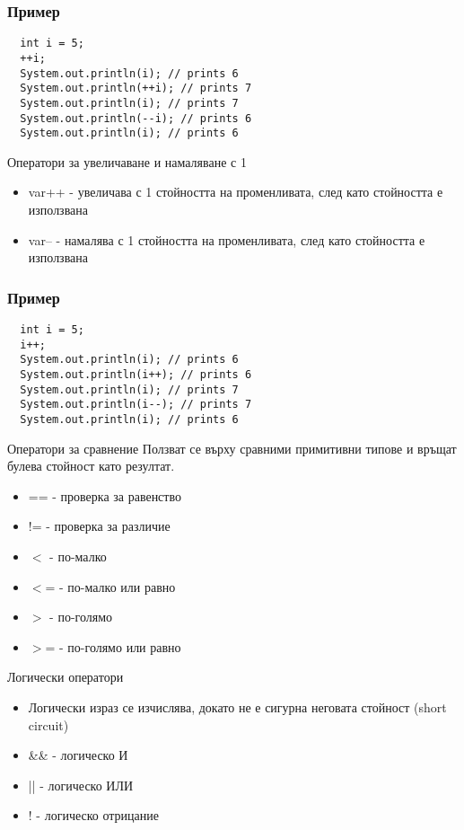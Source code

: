 \documentclass{beamer}
\begin{document}
\begin{frame}[fragile]
  \frametitle{Пример}
\begin{lstlisting}
  int i = 5;
  ++i;
  System.out.println(i); // prints 6
  System.out.println(++i); // prints 7
  System.out.println(i); // prints 7
  System.out.println(--i); // prints 6
  System.out.println(i); // prints 6
\end{lstlisting}
\end{frame}


\begin{frame}{Оператори за увеличаване и намаляване с 1}
  \begin{itemize}
  \item var++ - увеличава с 1 стойността на
    променливата, след като стойността е
    използвана
  \item var-- - намалява с 1 стойността на
    променливата, след като стойността е
    използвана
  \end{itemize}
\end{frame}

\begin{frame}[fragile]
  \frametitle{Пример}
\begin{lstlisting}
  int i = 5;
  i++;
  System.out.println(i); // prints 6
  System.out.println(i++); // prints 6
  System.out.println(i); // prints 7
  System.out.println(i--); // prints 7
  System.out.println(i); // prints 6
\end{lstlisting}
\end{frame}


\begin{frame}{Оператори за сравнение}
  Ползват се върху сравними примитивни
  типове и връщат булева стойност като резултат.
  
  \begin{itemize}
  \item == - проверка за равенство
  \item != - проверка за различие
  \item $<$  - по-малко
  \item $<$= - по-малко или равно
  \item $>$  - по-голямо
  \item $>$= - по-голямо или равно
  \end{itemize}

\end{frame}


\begin{frame}{Логически оператори}
  \begin{itemize}
  \item   Логически израз се изчислява, докато
    не е сигурна неговата стойност (short
    circuit)
  \item \&\& - логическо И
  \item || - логическо ИЛИ
  \item ! - логическо отрицание

  \end{itemize}
\end{frame}
\end{document}
